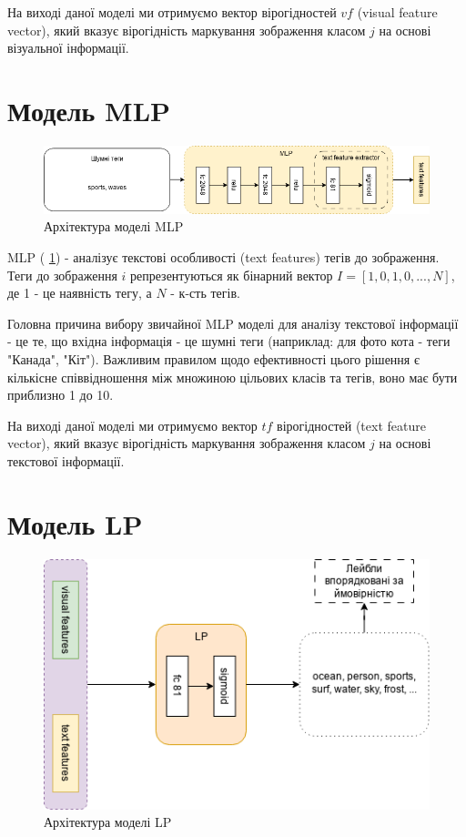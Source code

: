 \documentclass{udstu}
\begin{document}
На виході даної моделі ми отримуємо вектор вірогідностей $vf$ (visual feature vector),
який вказує вірогідність маркування зображення класом $j$ на основі візуальної інформації.


\section{Модель MLP}

\begin{figure}[!ht]
	\centering
	\includegraphics[width=1.0\textwidth]{PNG/mlp}
	\caption{Архітектура моделі MLP}
	\label{figure:mlp}
\end{figure}

MLP (\figurename{ \ref{figure:mlp}}) - аналізує текстові особливості (text features) тегів до зображення.
Теги до зображення $i$ репрезентуються як бінарний вектор $I = [1,0,1,0, ..., N]$,
де 1 - це наявність тегу, а $N$ - к-сть тегів.

Головна причина вибору звичайної MLP моделі для аналізу текстової інформації - це
те, що вхідна інформація - це шумні теги (наприклад: для фото кота - теги "Канада", "Кіт").
Важливим правилом щодо ефективності цього рішення є кількісне співвідношення між множиною
цільових класів та тегів, воно має бути приблизно 1 до 10.

На виході даної моделі ми отримуємо вектор $tf$ вірогідностей (text feature vector),
який вказує вірогідність маркування зображення класом $j$ на основі текстової інформації.


\section{Модель LP}

\begin{figure}[!ht]
	\centering
	\includegraphics[width=1.0\textwidth]{PNG/lp}
	\caption{Архітектура моделі LP}
	\label{figure:lp}
\end{figure}
\end{document}
